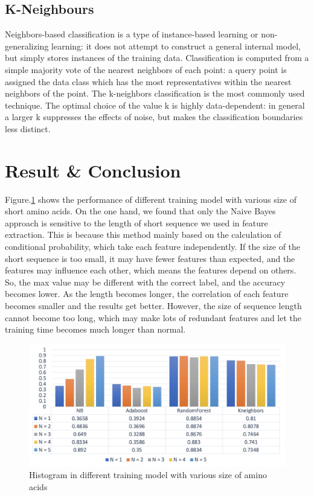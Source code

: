 \documentclass[sigconf]{acmart}
\begin{document}
\subsection{K-Neighbours}
Neighbors-based classification is a type of instance-based learning or non-generalizing learning: it does not attempt to construct a general internal model, but simply stores instances of the training data. Classification is computed from a simple majority vote of the nearest neighbors of each point: a query point is assigned the data class which has the most representatives within the nearest neighbors of the point\cite{chua2006exploiting}.
The k-neighbors classification is the most commonly used technique. The optimal choice of the value k is highly data-dependent: in general a larger k suppresses the effects of noise, but makes the classification boundaries less distinct.

\section{Result & Conclusion}
Figure.\ref{4} shows the performance of different training model with various size of short amino acids. On the one hand, we found that only the Naive Bayes approach is sensitive to the length of short sequence we used in feature extraction. This is because this method mainly based on the calculation of conditional probability, which take each feature independently. If the size of the short sequence is too small, it may have fewer features than expected, and the features may influence each other, which means the features depend on others. So, the max value may be different with the correct label, and the accuracy becomes lower. As the length becomes longer, the correlation of each feature becomes smaller and the results get better. However, the size of sequence length cannot become too long, which may make lots of redundant features and let the training time becomes much longer than normal.

\begin{figure}[h]
  \centering
  \includegraphics[width=\linewidth]{4.png}
  \caption{Histogram in different training model with various size of amino acids}
  \label{4}
\end{figure}
\end{document}

